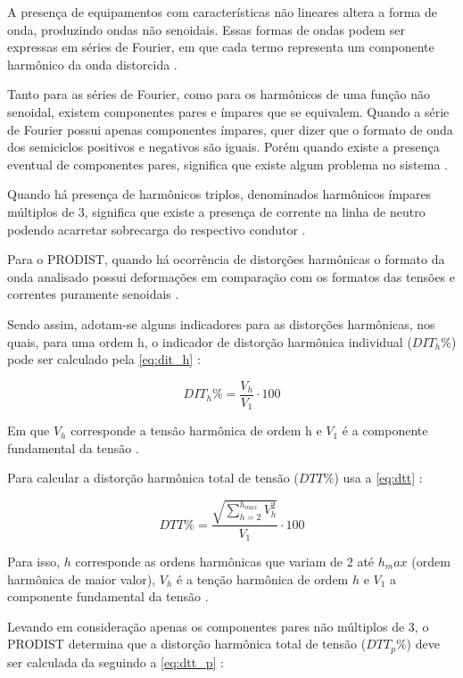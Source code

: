A presença de equipamentos com características não lineares altera a forma de onda, produzindo ondas não senoidais. Essas formas de ondas podem ser expressas em séries de Fourier, em que cada termo representa um componente harmônico da onda distorcida \cite{ref:fuchs_2015}.

Tanto para as séries de Fourier, como para os harmônicos de uma função não senoidal, existem componentes pares e ímpares que se equivalem. Quando a série de Fourier possui apenas componentes ímpares, quer dizer que o formato de onda dos semiciclos positivos e negativos são iguais. Porém quando existe a presença eventual de componentes pares, significa que existe algum problema no sistema \cite{ref:fuchs_2015}.

Quando há presença de harmônicos triplos, denominados harmônicos ímpares múltiplos de 3, significa que existe a presença de corrente na linha de neutro podendo acarretar sobrecarga do respectivo condutor \cite{ref:fuchs_2015}.

Para o PRODIST, quando há ocorrência de distorções harmônicas o formato da onda analisado possui deformações em comparação com os formatos das tensões e correntes puramente senoidais \cite{ref:ANEEL2021}.

Sendo assim, adotam-se alguns indicadores para as distorções harmônicas, nos quais, para uma ordem h, o indicador de distorção harmônica individual ($DIT_h\%$) pode ser calculado pela \autoref{eq:dit_h} \cite{ref:ANEEL2021}:

\begin{equation}
  DIT_h\% = \frac{V_h}{V_1}\cdot 100
  \label{eq:dit_h}
\end{equation}

Em que $V_h$ corresponde a tensão harmônica de ordem h e $V_1$ é a componente fundamental da tensão \cite{ref:ANEEL2021}.

Para calcular a distorção harmônica total de tensão ($DTT\%$) usa a \autoref{eq:dtt} \cite{ref:ANEEL2021}:

\begin{equation}
  DTT\% = \frac{\sqrt{\sum_{h=2}^{h_{max}}V_h^2}}{V_1}\cdot 100
  \label{eq:dtt}
\end{equation}

Para isso, $h$ corresponde as ordens harmônicas que variam de 2 até $h_max$ (ordem harmônica de maior valor), $V_h$ é a tenção harmônica de ordem $h$ e $V_1$ a componente fundamental da tensão \cite{ref:ANEEL2021}.

Levando em consideração apenas os componentes pares não múltiplos de 3, o PRODIST determina que a distorção harmônica total de tensão ($DTT_p\%$) deve ser calculada da seguindo a \autoref{eq:dtt_p} \cite{ref:ANEEL2021}:

